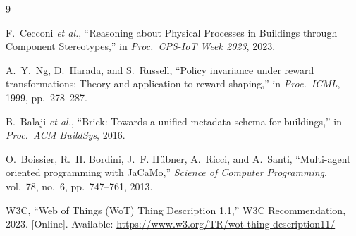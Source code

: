 \documentclass[conference]{IEEEtran}
\begin{document}
\begin{thebibliography}{9}

F.~Cecconi \emph{et al.}, ``Reasoning about Physical Processes in
Buildings through Component Stereotypes,'' in \emph{Proc.\ CPS-IoT
Week 2023}, 2023.

A.~Y.~Ng, D.~Harada, and S.~Russell, ``Policy invariance under reward
transformations: Theory and application to reward shaping,'' in
\emph{Proc.\ ICML}, 1999, pp.\ 278--287.

B.~Balaji \emph{et al.}, ``Brick: Towards a unified metadata schema
for buildings,'' in \emph{Proc.\ ACM BuildSys}, 2016.

O.~Boissier, R.~H. Bordini, J.~F. H\"ubner, A.~Ricci, and A.~Santi,
``Multi-agent oriented programming with JaCaMo,'' \emph{Science of
Computer Programming}, vol.~78, no.~6, pp.\ 747--761, 2013.

W3C, ``Web of Things (WoT) Thing Description 1.1,'' W3C
Recommendation, 2023. [Online]. Available:
\url{https://www.w3.org/TR/wot-thing-description11/}

\end{thebibliography}
\end{document}
